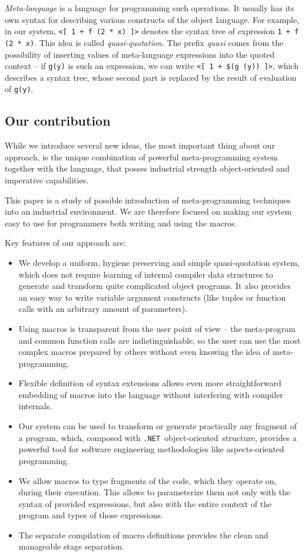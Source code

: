 \documentclass{llncs}
\newcommand{\net}[0]{{\tt .NET}}
\newcommand{\oo}[0]{object-oriented}
\begin{document}
\emph{Meta-language} is a language for programming such operations. It 
usually has its own syntax for describing various constructs of the object language.
For example, in our system, \verb,<[ 1 + f (2 * x) ]>, denotes the syntax 
tree of expression \verb,1 + f (2 * x),. This idea is called \emph{quasi-quotation}. 
The prefix \emph{quasi} comes from the possibility of inserting values 
of meta-language expressions into the quoted context -- if \verb,g(y), is such 
an expression, we can write \verb.<[ 1 + $(g (y)) ]>., %
which describes a syntax tree, whose second part is replaced by the result of 
evaluation of \verb,g(y),.

\subsection{Our contribution}
While we introduce several new ideas, the most important thing about
our approach, is the unique combination of powerful meta-programming
system together with the language, that posses industrial strength
object-oriented and imperative capabilities.

This paper is a study of possible introduction of meta-programming
techniques into an industrial environment. We are therefore focused on
making our system easy to use for programmers both writing and using
the macros.

Key features of our approach are:

\begin{itemize}
  \item We develop a uniform, hygiene preserving and simple quasi-quotation system, 
    which does not require learning of internal compiler data structures to generate 
    and transform quite complicated object programs. It also provides an easy way to 
    write variable argument constructs (like tuples or function calls with an arbitrary 
    amount of parameters).
  \item Using macros is transparent from the user point of view -- the meta-program and 
    common function calls are indistinguishable, so the user can use the most complex
    macros prepared by others without even knowing the idea of meta-programming.
  \item Flexible definition of syntax extensions allows even more straightforward 
    embedding of macros into the language without interfering with compiler internals.
  \item Our system can be used to transform or generate practically any fragment
    of a program, which, composed with \net\ \oo\ structure, provides a powerful tool for
    software engineering methodologies like aspects-oriented programming.
  \item We allow macros to type fragments of the code, which they operate on, during
    their execution. This allows to parameterize them not only with the syntax of provided
    expressions, but also with the entire context of the program and types of those 
    expressions.
  \item The separate compilation of macro definitions provides the clean and manageable 
    stage separation.
\end{itemize}
\end{document}
